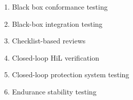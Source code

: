     \label{orth-test-exs}
    \begin{enumerate}
        \item Black box conformance testing \citep[p.~25]{JardEtAl1999}
        \item Black-box integration testing \citep[pp.~345\==346]{SakamotoEtAl2013}
        \item Checklist-based reviews \citepISTQB{}
        \item Closed-loop HiL verification \citep[p.~6]{PreußeEtAl2012}
        \item Closed-loop protection system testing \citep[p.~331]{ForsythEtAl2004}
        \item Endurance stability testing \citep[p.~55]{Firesmith2015}

\end{enumerate}
